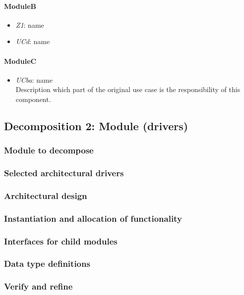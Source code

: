 \documentclass[a4paper,10pt]{article}
\begin{document}
\paragraph{ModuleB}
\begin{itemize}
    \item \emph{Z1}: name
    \item \emph{UCd}: name
\end{itemize}

\paragraph{ModuleC}
\begin{itemize}
    \item \emph{UCba}: name\\Description which part of the original use case is
        the responsibility of this component.
\end{itemize}

\subsection{Decomposition 2: Module (drivers)}
\subsubsection{Module to decompose}
\subsubsection{Selected architectural drivers}
\subsubsection{Architectural design}
\subsubsection{Instantiation and allocation of functionality}
\subsubsection{Interfaces for child modules}
\subsubsection{Data type definitions}
\subsubsection{Verify and refine}
\end{document}
